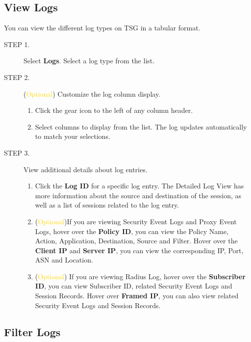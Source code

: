 \subsection*{\hypertarget{link:View Logs}{View Logs}}
\label{sec:monitor:log:view}

You can view the different log types on TSG in a tabular format.


\begin{description}
    \item[STEP 1.]	Select \textbf{Logs}. Select a log type from the list. 
    \item[STEP 2.]	(\textcolor{gold}{Optional}) Customize the log column display.
    \begin{enumerate} 
        \item Click the gear icon to the left of any column header.
        \item Select columns to display from the list. The log updates automatically to match your selections.
    \end{enumerate}
    \item[STEP 3.]	View additional details about log entries.
    \begin{enumerate}
        \item Click the \textbf{Log ID} for a specific log entry. The Detailed Log View has more information about the source and destination of the session, as well as a list of sessions related to the log entry.
        \item (\textcolor{gold}{Optional})If you are viewing Security Event Logs and Proxy Event Logs, hover over the \textbf{Policy ID}, 
        you can view the Policy Name, Action, Application, Destination, Source and Filter. 
        Hover over the \textbf{Client IP} and \textbf{Server IP}, you can view the corresponding IP, Port, ASN and Location.
        \item (\textcolor{gold}{Optional}) If you are viewing Radius Log, hover over the \textbf{Subscriber ID}, you can view Subscriber ID, related Security Event Logs and Session Records. 
        Hover over \textbf{Framed IP}, you can also view related Security Event Logs and Session Records.
    \end{enumerate}
\end{description}

\subsection*{\hypertarget{link:Filter Logs}{Filter Logs}}
\label{sec:monitor:log:filter}

